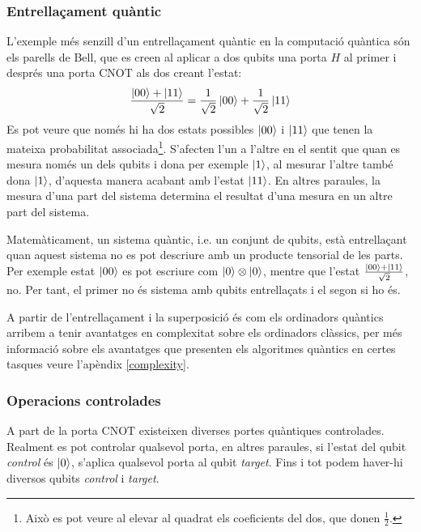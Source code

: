 \subsubsection{Entrellaçament quàntic}
L'exemple més senzill d'un entrellaçament quàntic en la computació quàntica són els parells de Bell, que es creen al aplicar a dos qubits una porta $H$ al primer i després una porta $\mathrm{CNOT}$ als dos creant l'estat:
$$
\frac{\ket{00}+\ket{11}}{\sqrt{2}} = \frac{1}{\sqrt{2}}\ket{00} + \frac{1}{\sqrt{2}}\ket{11}
$$
Es pot veure que només hi ha dos estats possibles $\ket{00}$ i $\ket{11}$ que tenen la mateixa probabilitat associada\footnote{Això es pot veure al elevar al quadrat els coeficients del dos, que donen $\frac{1}{2}$.}. S'afecten l'un a l'altre en el sentit que quan es mesura només un dels qubits i dona per exemple $\ket{1}$, al mesurar l'altre també dona $\ket{1}$, d'aquesta manera acabant amb l'estat $\ket{11}$. En altres paraules, la mesura d'una part del sistema determina el resultat d'una mesura en un altre part del sistema.

Matemàticament, un sistema quàntic, i.e. un conjunt de qubits, està entrellaçant quan aquest sistema no es pot descriure amb un producte tensorial de les parts. Per exemple estat $\ket{00}$ es pot escriure com $\ket{0}\otimes\ket{0}$, mentre que l'estat $\frac{\ket{00} + \ket{11}}{\sqrt{2}}$, no. Per tant, el primer no és sistema amb qubits entrellaçats i el segon si ho és.

A partir de l'entrellaçament i la superposició és com els ordinadors quàntics arribem a tenir avantatges en complexitat sobre els ordinadors clàssics, per més informació sobre els avantatges que presenten els algoritmes quàntics en certes tasques veure l'apèndix \ref{complexity}.

\subsubsection{Operacions controlades}
A part de la porta $\mathrm{CNOT}$ existeixen diverses portes quàntiques controlades. Realment es pot controlar qualsevol porta, en altres paraules, si l'estat del qubit \textit{control} és $\ket{0}$, s'aplica qualsevol porta al qubit \textit{target}. Fins i tot podem haver-hi diversos qubits \textit{control} i \textit{target}.

